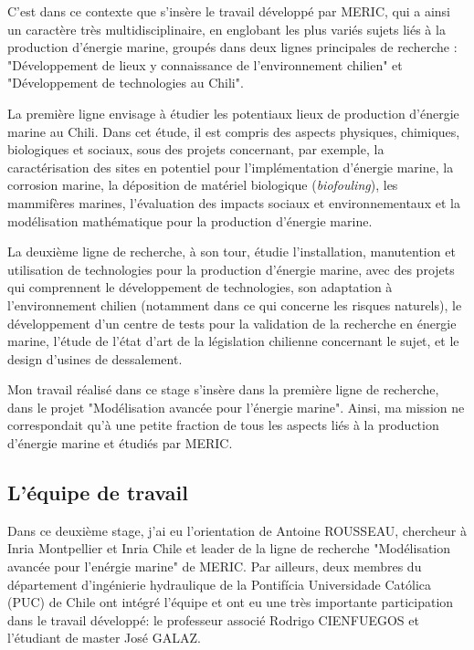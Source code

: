 \indent C'est dans ce contexte que s'insère le travail développé par MERIC, qui a ainsi un caractère très multidisciplinaire, en englobant les plus variés sujets liés à la production d'énergie marine, groupés dans deux lignes principales de recherche : "Développement de lieux y connaissance de l'environnement chilien" et "Développement de technologies au Chili".

\indent La première ligne envisage à étudier les potentiaux lieux de production d'énergie marine au Chili. Dans cet étude, il est compris des aspects physiques, chimiques, biologiques et sociaux, sous des projets concernant, par exemple, la caractérisation des sites en potentiel pour l'implémentation d'énergie marine, la corrosion marine, la déposition de matériel biologique (\emph{biofouling}), les mammifères marines, l'évaluation des impacts sociaux et environnementaux et la modélisation mathématique pour la production d'énergie marine.

\indent La deuxième ligne de recherche, à son tour, étudie l'installation, manutention et utilisation de technologies pour la production d'énergie marine, avec des projets qui comprennent le développement de technologies, son adaptation à l'environnement chilien (notamment dans ce qui concerne les risques naturels), le développement d'un centre de tests pour la validation de la recherche en énergie marine, l'étude de l'état d'art de la législation chilienne concernant le sujet, et le design d'usines de dessalement.

\indent Mon travail réalisé dans ce stage s'insère dans la première ligne de recherche, dans le projet "Modélisation avancée pour l'énergie marine". Ainsi, ma mission ne correspondait qu'à une petite fraction de tous les aspects liés à la production d'énergie marine et étudiés par MERIC.

\subsection{L'équipe de travail}

\indent Dans ce deuxième stage, j'ai eu l'orientation de Antoine ROUSSEAU, chercheur à Inria Montpellier et Inria Chile et leader de la ligne de recherche "Modélisation avancée pour l'enérgie marine" de MERIC. Par ailleurs, deux membres du département d'ingénierie hydraulique de la Pontifícia  Universidade Católica (PUC) de Chile ont intégré l'équipe et ont eu une très importante participation dans le travail développé: le professeur associé Rodrigo CIENFUEGOS et l'étudiant de master José GALAZ.
